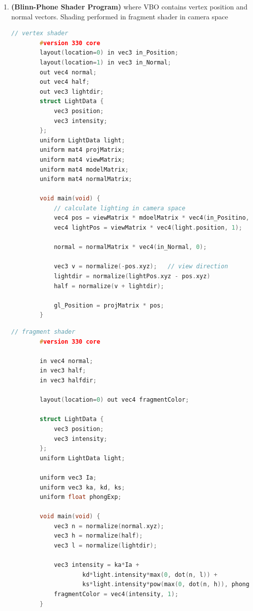 \documentclass[11pt]{article}
\newcommand{\bheading}[1]{\textbf{(#1)}}
\begin{document}
\begin{enumerate}
    \item \bheading{Blinn-Phone Shader Program} where VBO contains vertex position and normal vectors. Shading performed in fragment shader in camera space
    \begin{lstlisting}[frame=single, language=c++]
        // vertex shader
        #version 330 core
        layout(location=0) in vec3 in_Position;
        layout(location=1) in vec3 in_Normal;
        out vec4 normal;
        out vec4 half;
        out vec3 lightdir;
        struct LightData {
            vec3 position;
            vec3 intensity;
        };
        uniform LightData light;
        uniform mat4 projMatrix;
        uniform mat4 viewMatrix;
        uniform mat4 modelMatrix;
        uniform mat4 normalMatrix;
        
        void main(void) {
            // calculate lighting in camera space
            vec4 pos = viewMatrix * mdoelMatrix * vec4(in_Positino, 1);
            vec4 lightPos = viewMatrix * vec4(light.position, 1);

            normal = normalMatrix * vec4(in_Normal, 0);

            vec3 v = normalize(-pos.xyz);   // view direction
            lightdir = normalize(lightPos.xyz - pos.xyz)
            half = normalize(v + lightdir);

            gl_Position = projMatrix * pos;
        }
    \end{lstlisting}
    \begin{lstlisting}[frame=single, language=c++]
        // fragment shader
        #version 330 core

        in vec4 normal;
        in vec3 half;
        in vec3 halfdir;

        layout(location=0) out vec4 fragmentColor;

        struct LightData {
            vec3 position;
            vec3 intensity;
        };
        uniform LightData light;

        uniform vec3 Ia;
        uniform vec3 ka, kd, ks;
        uniform float phongExp;

        void main(void) {
            vec3 n = normalize(normal.xyz);
            vec3 h = normalize(half);
            vec3 l = normalize(lightdir);

            vec3 intensity = ka*Ia + 
                    kd*light.intensity*max(0, dot(n, l)) + 
                    ks*light.intensity*pow(max(0, dot(n, h)), phongExp);
            fragmentColor = vec4(intensity, 1);
        }


\end{lstlisting}
\end{enumerate}
\end{document}
